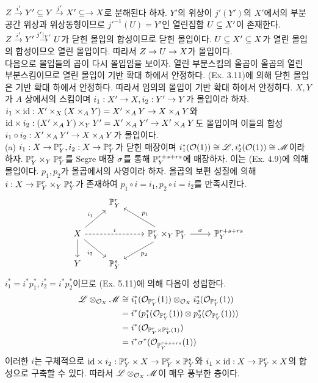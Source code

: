 \begin{enumerate}[label=\tb{5.\arabic*.},itemindent=0mm,itemsep=4mm]
	$Z\stackrel{i'}{\rightarrow} Y'\subseteq Y\stackrel{j'}{\rightarrow} X'\subseteq\rightarrow X$로 분해된다 하자.
	$Y'$의 위상이 $j'(Y')$의 $X'$에서의 부분공간 위상과 위상동형이므로 $j'^{-1}(U)=Y'$인 열린집합 $U\subseteq X'$이 존재한다.
	$Z\stackrel{i'}{\rightarrow} Y'\stackrel{j'|_{Y'}}{\rightarrow} U$가 닫힌 몰입의 합성이므로 닫힌 몰입이다.
	$U\subseteq X'\subseteq X$가 열린 몰입의 합성이므오 열린 몰입이다. 따라서 $Z\rightarrow U\rightarrow X$가 몰입이다.\\
	다음으로 몰입들의 곱이 다시 몰입임을 보이자.
	열린 부분스킴의 올곱이 올곱의 열린 부분스킴이므로 열린 몰입이 기반 확대 하에서 안정하다.
	(Ex. 3.11)에 의해 닫힌 몰입은 기반 확대 하에서 안정하다. 따라서 임의의 몰입이 기반 확대 하에서 안정하다.
	$X,Y$가 $A$ 상에서의 스킴이며 $i_1:X'\rightarrow X,i_2:Y'\rightarrow Y$가 몰입이라 하자.
	$i_1\times\mathrm{id}:X'\times_X(X\times_AY)=X'\times_AY\rightarrow X\times_AY$와
	$\mathrm{id}\times i_2:(X'\times_AY)\times_YY'=X'\times_AY'\rightarrow X'\times_AY$도 몰입이며
	이들의 합성 $i_1\circ i_2:X'\times_AY'\rightarrow X\times_AY$가 몰입이다.\\
	(a) $i_1:X\rightarrow\mathbb{P}_Y^r,i_2:X\rightarrow\mathbb{P}_Y^s$가 닫힌 매장이며 $i_1^*(\mathcal{O}(1))\cong\mathscr{L},i_2^*(\mathcal{O}(1))\cong\mathscr{M}$이라 하자.
	$\mathbb{P}_Y^r\times_Y\mathbb{P}_Y^s$를 Segre 매장 $\sigma$를 통해 $\mathbb{P}_Y^{r+s+rs}$에 매장하자. 이는 (Ex. 4.9)에 의해 몰입이다.
	$p_1,p_2$가 올곱에서의 사영이라 하자.
	올곱의 보편 성질에 의해 $i:X\rightarrow\mathbb{P}_Y^r\times_Y\mathbb{P}_Y^s$가 존재하여 $p_1\circ i=i_1,p_2\circ i=i_2$를 만족시킨다.
	$$\begin{tikzcd}&\mb P_Y^r\\
	X\arrow[d]\arrow[ur,"i_1"]\arrow[rr,dashed,"i"]\arrow[dr,swap,"i_2"]&&
	\mb P_Y^r\times_Y\mb P_Y^s\arrow[r,"\si"]\arrow[ul,swap,"p_1"]\arrow[dl,"p_2"]&\mb P_Y^{r+s+rs}\\
	Y&\mb P_Y^s\end{tikzcd}$$
	$i_1^*=i^*p_1^*,i_2^*=i^*p_2^*$이므로 (Ex. 5.11)에 의해 다음이 성립한다.
	\begin{align*}
	\mathscr{L}\otimes_{\mathcal{O}_X}\mathscr{M}&\cong i_1^*(\mathcal{O}_{\mathbb{P}_Y^r}(1))\otimes_{\mathcal{O}_X}i_2^*(\mathcal{O}_{\mathbb{P}_Y^s}(1))\\
	&=i^*(p_1^*(\mathcal{O}_{\mathbb{P}_Y^r}(1))\otimes p_2^*(\mathcal{O}_{\mathbb{P}_Y^s}(1)))\\
	&=i^*(\mathcal{O}_{\mathbb{P}_Y^r\times\mathbb{P}_Y^s(1)})\\
	&=i^*\sigma^*(\mathcal{O}_{\mathbb{P}_Y^{r+s+rs}}(1))
	\end{align*}
	이러한 $i$는 구체적으로 $\mathrm{id}\times i_2:\mathbb{P}_Y^r\times X\rightarrow\mathbb{P}_Y^r\times\mathbb{P}_Y^s$와
	$i_1\times\mathrm{id}:X\rightarrow\mathbb{P}_Y^r\times X$의 합성으로 구축할 수 있다.
	따라서 $\mathscr{L}\otimes_{\mathcal{O}_X}\mathscr{M}$이 매우 풍부한 층이다.\\

\end{enumerate}
